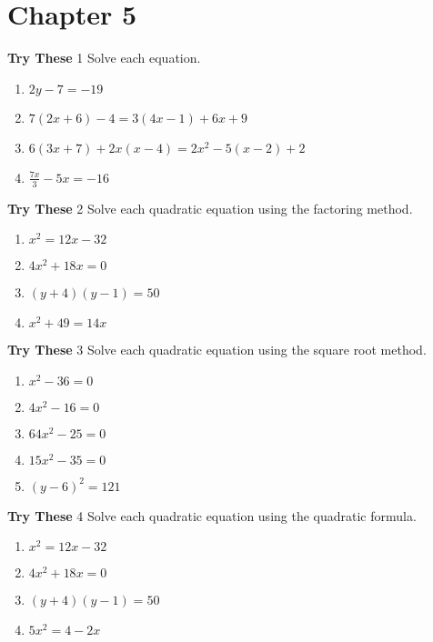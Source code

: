 \documentclass[a4paper]{JAC2003}
\begin{document}
\section{Chapter 5}

\noindent\textcolor{red!75!black}{\textbf{Try These}} 1 Solve each equation.
\begin{enumerate}
\item $2 y-7=-19$

\item $7(2 x+6)-4=3(4 x-1)+6 x+9$

\item $6(3 x+7)+2 x(x-4)=2 x^{2}-5(x-2)+2$

\item $\frac{7 x}{3}-5 x=-16$
\end{enumerate}

\noindent\textcolor{red!75!black}{\textbf{Try These}} 2 Solve each quadratic equation using the factoring method.
\begin{enumerate}
\item $x^{2}=12 x-32$

\item $4 x^{2}+18 x=0$

\item $(y+4)(y-1)=50$

\item $x^{2}+49=14 x$
\end{enumerate}

\noindent\textcolor{red!75!black}{\textbf{Try These}} 3 Solve each quadratic equation using the square root method.
\begin{enumerate}
\item $x^{2}-36=0$

\item $4 x^{2}-16=0$

\item $64 x^{2}-25=0$

\item $15 x^{2}-35=0$

\item $(y-6)^{2}=121$
\end{enumerate}

\noindent\textcolor{red!75!black}{\textbf{Try These}} 4 Solve each quadratic equation using the quadratic formula.
\begin{enumerate}
\item $x^{2}=12 x-32$

\item $4 x^{2}+18 x=0$

\item $(y+4)(y-1)=50$

\item $5 x^{2}=4-2 x$
\end{enumerate}
\end{document}

